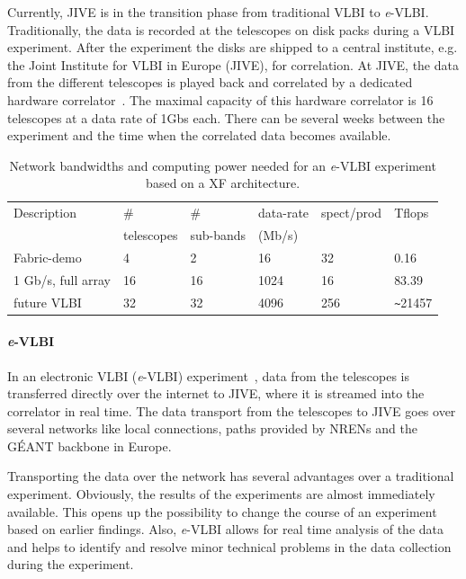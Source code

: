 Currently, JIVE is in the transition phase from traditional VLBI to
{\it e}-VLBI. Traditionally, the data is recorded at the telescopes on
disk packs during a VLBI experiment. After the experiment the disks
are shipped to a central institute, e.g. the Joint Institute for VLBI
in Europe (JIVE), for correlation. At JIVE, the data from the
different telescopes is played back and correlated by a dedicated
hardware correlator~\cite{EVNCorrelator}. The maximal capacity of this
hardware correlator is 16 telescopes at a data rate of 1Gbs each.
There can be several weeks between the experiment and the time when
the correlated data becomes available.

\begin{table}
  \centering
  \begin{tabular}[c]{|l|l|l|l|l|l|}
    \hline
    Description & \# & \#  & data-rate & spect/prod & Tflops\\
    & telescopes & sub-bands & (Mb/s) &  & \\
    \hline
    \hline
    Fabric-demo &4 &2 &16 &32 &0.16\\
    1 Gb/s, full array  &16 &16 &1024 &16 &83.39\\
    future VLBI &32 &32 &4096 &256 &\verb|~|21457\\
    \hline
  \end{tabular}
  \caption{Network bandwidths and computing power needed for an {\it e}-VLBI
    experiment based on a XF architecture.}
  \label{tab:speed}
\end{table}
\paragraph{{\it e}-VLBI}
In an electronic VLBI ({\it e}-VLBI) experiment~\cite{szomoru-2004},
data from the telescopes is transferred directly over the internet to
JIVE, where it is streamed into the correlator in real time. The data
transport from the telescopes to JIVE goes over several networks like
local connections, paths provided by NRENs and the G\'EANT backbone in
Europe.

Transporting the data over the network has several advantages over a
traditional experiment. Obviously, the results of the experiments are
almost immediately available. This opens up the possibility to change
the course of an experiment based on earlier findings. Also, {\it
  e}-VLBI allows for real time analysis of the data and helps to
identify and resolve minor technical problems in the data collection
during the experiment.

